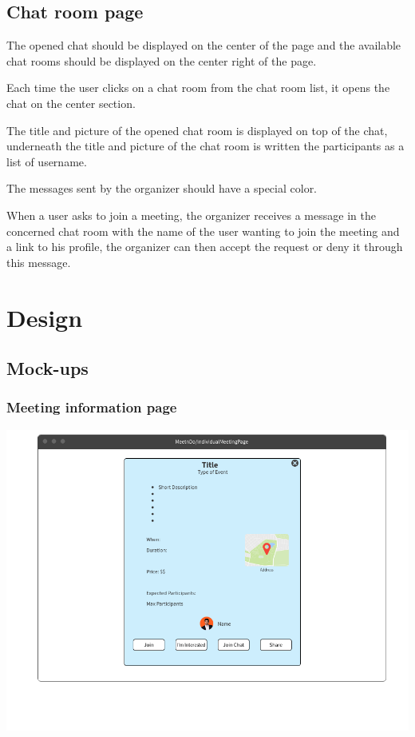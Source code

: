 \documentclass[conference]{IEEEtran}
\begin{document}
\subsection{Chat room page}

The opened chat should be displayed on the center of the page and the available chat rooms should be displayed on the center right of the page.

Each time the user clicks on a chat room from the chat room list, it opens the chat on the center section. 

The title and picture of the opened chat room is displayed on top of the chat, underneath the title and picture of the chat room is written the participants as a list of username.

The messages sent by the organizer should have a special color.

When a user asks to join a meeting, the organizer receives a message in the concerned chat room with the name of the user wanting to join the meeting and a link to his profile, the organizer can then accept the request or deny it through this message.

\section{Design}

\subsection{Mock-ups}

\subsubsection{Meeting information page}

\includegraphics[scale=0.3]{mockups/meeting}
\end{document}
